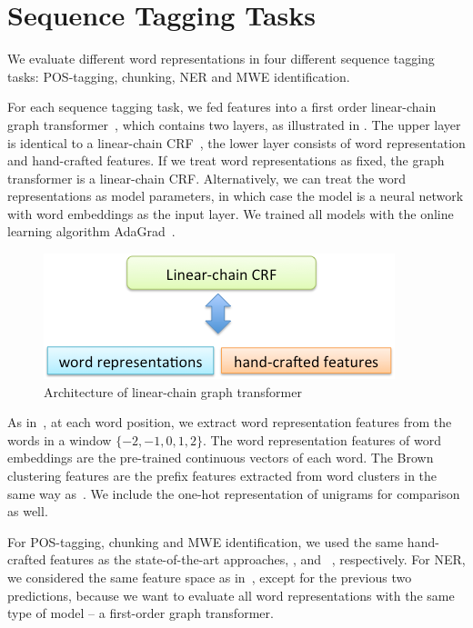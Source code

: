 \section{Sequence Tagging Tasks}
\label{sec:SeqTagging}
We evaluate different word representations in four different sequence tagging tasks: POS-tagging, chunking, NER and MWE identification. 

For each sequence tagging task, we fed features into a first order linear-chain graph
transformer~\cite{collobert2011natural}, which contains two layers, as illustrated in . The upper layer is identical to a linear-chain CRF~\cite{lafferty2001conditional}, the lower layer consists of word representation and hand-crafted features. If we treat word representations as fixed, the graph transformer is a linear-chain CRF. Alternatively, we can treat the word representations as model parameters, in which case the model is a neural network with word embeddings as the input layer. We trained all models with the online learning algorithm AdaGrad~\cite{duchi2011adaptive}. 


\begin{figure}[t]
  \centering
  \includegraphics[scale = 0.3]{images/graph_transformer.png}
  \caption{Architecture of linear-chain graph transformer}
  \label{fig:graph_transformer}
\end{figure}


As in~\cite{turian2010word}, at each word position, we extract word representation features from the words in a window $\{-2, -1, 0, 1, 2\}$. The word representation features of word embeddings are the pre-trained continuous vectors of each word.  The Brown clustering features are the prefix features extracted from word clusters in the same way as~\cite{turian2010word}. We include the one-hot representation of unigrams for comparison as well.

For POS-tagging, chunking and MWE identification, we used the same hand-crafted features as the state-of-the-art approaches,  ,  and ~, respectively. For NER, we considered the same feature space as in~\cite{turian2010word}, except for the previous two predictions, because we want to evaluate all word representations with the same type of model -- a first-order graph transformer.

